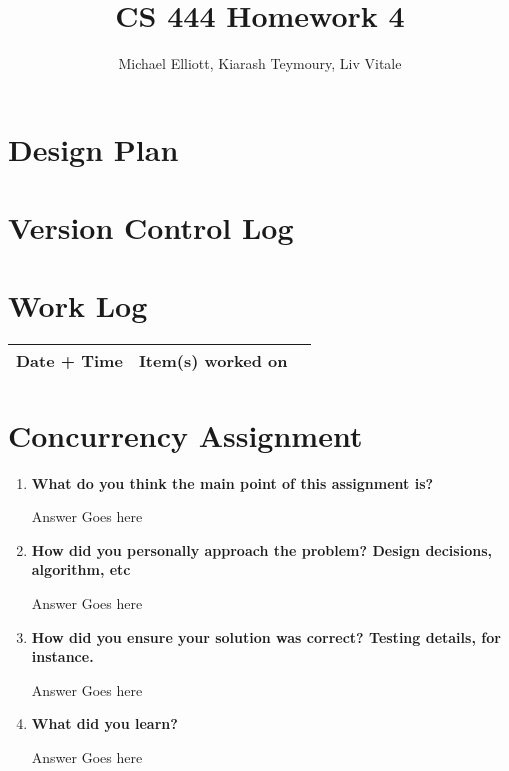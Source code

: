 \documentclass[letterpaper,10pt,titlepage,draftclsnofoot,onecolumn]{IEEEtran}
\title{CS 444 Homework 4}
\author{Michael Elliott, Kiarash Teymoury, Liv Vitale}
\begin{document}
\section{Design Plan}


\section{Version Control Log}


\section{Work Log}
\begin{tabular}{l | c | r}
Date + Time & Item(s) worked on \\
\hline

\end{tabular}

\section{Concurrency Assignment}
\begin{enumerate}
\item \textbf{What do you think the main point of this assignment is?}

Answer Goes here

\item \textbf{How did you personally approach the problem? Design decisions, algorithm, etc}

Answer Goes here

\item \textbf{How did you ensure your solution was correct? Testing details, for instance.}

Answer Goes here

\item \textbf{What did you learn?}

Answer Goes here

\end{enumerate}

\nocite{*}



\end{document}
